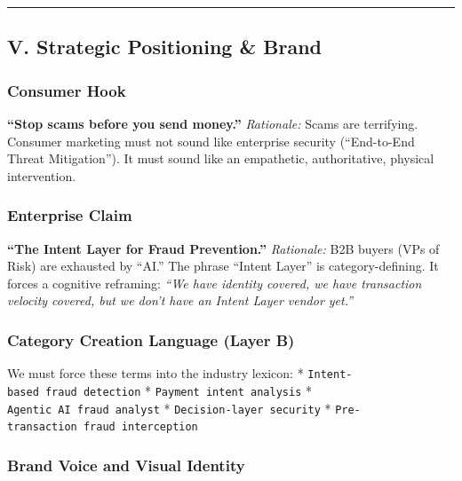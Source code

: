 \documentclass[
]{article}
\begin{document}
\begin{center}\rule{0.5\linewidth}{0.5pt}\end{center}

\subsection{V. Strategic Positioning \&
Brand}\label{v.-strategic-positioning-brand}

\subsubsection{Consumer Hook}\label{consumer-hook}

\textbf{``Stop scams before you send money.''} \emph{Rationale:} Scams
are terrifying. Consumer marketing must not sound like enterprise
security (``End-to-End Threat Mitigation''). It must sound like an
empathetic, authoritative, physical intervention.

\subsubsection{Enterprise Claim}\label{enterprise-claim}

\textbf{``The Intent Layer for Fraud Prevention.''} \emph{Rationale:}
B2B buyers (VPs of Risk) are exhausted by ``AI.'' The phrase ``Intent
Layer'' is category-defining. It forces a cognitive reframing:
\emph{``We have identity covered, we have transaction velocity covered,
but we don't have an Intent Layer vendor yet.''}

\subsubsection{Category Creation Language (Layer
B)}\label{category-creation-language-layer-b}

We must force these terms into the industry lexicon: *
\texttt{Intent-based\ fraud\ detection} *
\texttt{Payment\ intent\ analysis} *
\texttt{Agentic\ AI\ fraud\ analyst} * \texttt{Decision-layer\ security}
* \texttt{Pre-transaction\ fraud\ interception}

\subsubsection{Brand Voice and Visual
Identity}\label{brand-voice-and-visual-identity}
\end{document}
